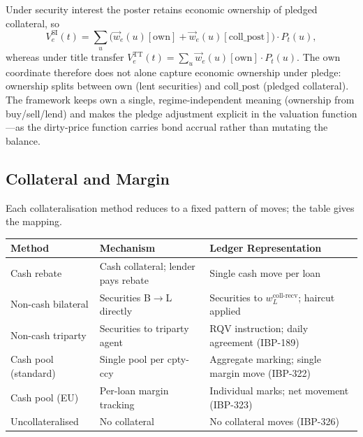 \begin{remark}
Under security interest the poster retains economic ownership of pledged collateral, so
\[
V_e^{\mathrm{SI}}(t) = \sum_u \bigl(\vec{w}_e(u)[\mathrm{own}] + \vec{w}_e(u)[\mathrm{coll\_post}]\bigr)\cdot P_t(u),
\]
whereas under title transfer $V_e^{\mathrm{TT}}(t) = \sum_u \vec{w}_e(u)[\mathrm{own}]\cdot P_t(u)$. The $\mathrm{own}$ coordinate therefore does not alone capture economic ownership under pledge: ownership splits between $\mathrm{own}$ (lent securities) and $\mathrm{coll\_post}$ (pledged collateral). The framework keeps $\mathrm{own}$ a single, regime-independent meaning (ownership from buy/sell/lend) and makes the pledge adjustment explicit in the valuation function---as the dirty-price function carries bond accrual rather than mutating the balance.
\end{remark}

\subsection{Collateral and Margin}
\label{sec:sbl-collateral}

Each collateralisation method reduces to a fixed pattern of moves; the table gives the mapping.

\begin{center}
\small
\begin{tabular}{l p{3.5cm} p{5cm}}
\toprule
\textbf{Method} & \textbf{Mechanism} & \textbf{Ledger Representation} \\
\midrule
Cash rebate & Cash collateral; lender pays rebate & Single cash move per loan \\
Non-cash bilateral & Securities B$\to$L directly & Securities to $w^{\mathrm{coll\text{-}recv}}_L$; haircut applied \\
Non-cash triparty & Securities to triparty agent & RQV instruction; daily agreement (IBP-189) \\
Cash pool (standard) & Single pool per cpty-ccy & Aggregate marking; single margin move (IBP-322) \\
Cash pool (EU) & Per-loan margin tracking & Individual marks; net movement (IBP-323) \\
Uncollateralised & No collateral & No collateral moves (IBP-326) \\
\bottomrule
\end{tabular}
\end{center}


